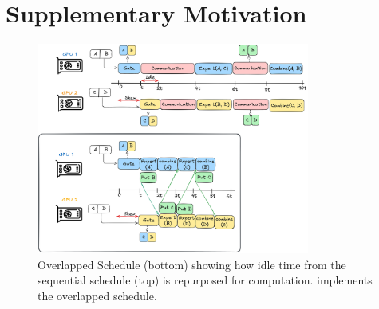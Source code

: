 \section{Supplementary Motivation}\label{sec:motivation-appx}
\begin{figure}[!ht]
    \centering
    \includegraphics[width=0.8\textwidth, keepaspectratio]{figures/s_overlap}
    \caption{Overlapped Schedule (bottom) showing how idle time from the sequential schedule (top)
        is repurposed for computation. \sysname implements the overlapped schedule.}
    \label{fig:overlap}
\end{figure}
